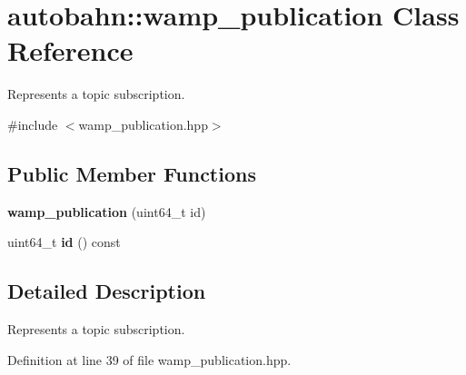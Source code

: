 \hypertarget{classautobahn_1_1wamp__publication}{}\section{autobahn\+:\+:wamp\+\_\+publication Class Reference}
\label{classautobahn_1_1wamp__publication}


Represents a topic subscription.  




{\ttfamily \#include $<$wamp\+\_\+publication.\+hpp$>$}

\subsection*{Public Member Functions}
\begin{DoxyCompactItemize}
\item 
{\bfseries wamp\+\_\+publication} (uint64\+\_\+t id)\hypertarget{classautobahn_1_1wamp__publication_a18dba6991f28540c2e784ee77f9fc5eb}{}\label{classautobahn_1_1wamp__publication_a18dba6991f28540c2e784ee77f9fc5eb}

\item 
uint64\+\_\+t {\bfseries id} () const \hypertarget{classautobahn_1_1wamp__publication_a68cdb9c236d8f1293576d95be055d6d4}{}\label{classautobahn_1_1wamp__publication_a68cdb9c236d8f1293576d95be055d6d4}

\end{DoxyCompactItemize}


\subsection{Detailed Description}
Represents a topic subscription. 

Definition at line 39 of file wamp\+\_\+publication.\+hpp.

